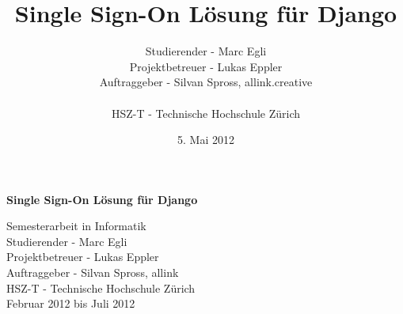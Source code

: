 \documentclass[]{report}
\title{Single Sign-On Lösung für Django}
\author{Studierender - Marc Egli\\
    Projektbetreuer - Lukas Eppler\\
    Auftraggeber - Silvan Spross, allink.creative\\
    \\
    HSZ-T - Technische Hochschule Zürich}
\date{5. Mai 2012}
\begin{document}
    \pagestyle{empty}
    \vspace{0.5cm}
    \begin{center}
        \bf
        \Huge
        Single Sign-On Lösung für Django
    \end{center}
    \begin{center}
        \Large
        Semesterarbeit in Informatik\\
        \vspace{1cm}
        Studierender - Marc Egli\\
        \vspace{0.3cm}
        Projektbetreuer - Lukas Eppler\\
        \vspace{0.3cm}
        Auftraggeber - Silvan Spross, allink\\
        \vspace{0.5cm}
        HSZ-T - Technische Hochschule Zürich\\
        \vspace{0.3cm}
        Februar 2012 bis Juli 2012
    \end{center}
    \vspace{2cm}
    \large
    


  
\end{document}
